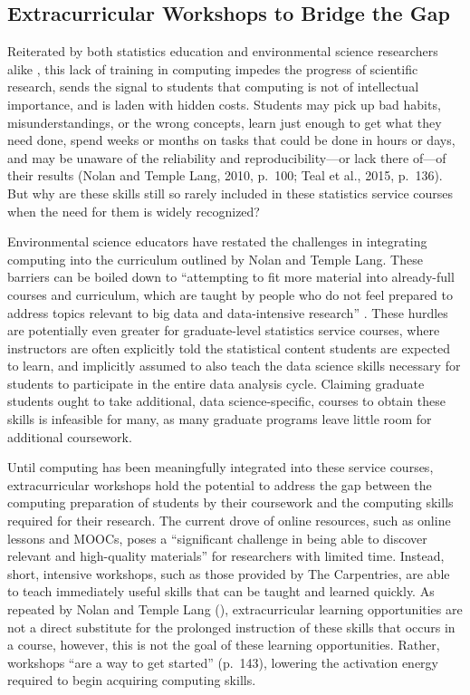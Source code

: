 \documentclass[12pt]{article}
\begin{document}
\subsection{Extracurricular Workshops to Bridge the Gap}

\noindent Reiterated by both statistics education and environmental science 
researchers alike \citep{nolan, carpentry}, this lack of training in 
computing impedes the progress of scientific research, sends the 
signal to students that computing is not of intellectual importance, and is 
laden with hidden costs. Students may pick up bad habits, misunderstandings, or 
the wrong concepts, learn just enough to get what they need done, spend weeks or
months on tasks that could be done in hours or days, and may be unaware of 
the reliability and reproducibility---or lack there of---of their results (Nolan
and Temple Lang, 2010, p.\ 100; Teal et al., 2015, p.\ 136). But why are these
skills still so rarely included in these statistics service courses when the
need for them is widely recognized?

\quad Environmental science educators have restated the challenges in 
integrating computing into the curriculum outlined by Nolan and Temple Lang. 
These barriers can be boiled down to ``attempting to fit more material into
already-full courses and curriculum, which are taught by people who do not feel
prepared to address topics relevant to big data and data-intensive research'' 
\citep[p.\ 547]{hampton}. These hurdles are potentially even greater for 
graduate-level statistics service courses, where instructors are often
explicitly told the statistical content students are expected to learn, and 
implicitly assumed to also teach the data science skills necessary for students 
to participate in the entire data analysis cycle. Claiming graduate students
ought to take additional, data science-specific, courses to obtain these skills
is infeasible for many, as many graduate programs leave little room for
additional coursework. 

\quad Until computing has been meaningfully integrated into these service 
courses, extracurricular workshops hold the potential to address the gap between
the computing preparation of students by their coursework and the 
computing skills required for their research. The current drove of online
resources, such as online lessons and MOOCs, poses a ``significant challenge
in being able to discover relevant and high-quality materials'' 
\citep[p.\ 136]{carpentry} for researchers with limited time. Instead, short,
intensive workshops, such as those provided by The Carpentries, are able to
teach immediately useful skills that can be taught and learned quickly. As
repeated by Nolan and Temple Lang (\citeyear{esr}), extracurricular
learning opportunities are not a direct substitute for the prolonged instruction
of these skills that occurs in a course, however, this is not the goal of these
learning opportunities. Rather, workshops ``are a way to get started'' 
(p.\ 143),  lowering the activation energy required to begin acquiring computing
skills. 
\end{document}
